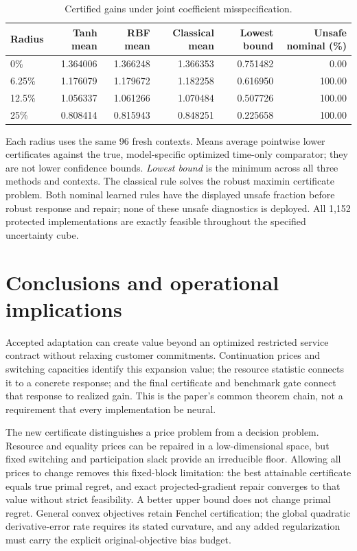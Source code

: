 \documentclass[11pt,letterpaper]{article}
\theoremstyle{definition}
\newcommand{\1}{\mathbf 1}
\begin{document}
\begin{table}[tbp]\centering\small
\caption{Certified gains under joint coefficient misspecification.}\label{tab:r23-robust}
\begin{tabular}{lrrrrr}\toprule
Radius & Tanh mean & RBF mean & Classical mean & Lowest bound & Unsafe nominal (\%)\\\midrule
0\% & 1.364006 & 1.366248 & 1.366353 & 0.751482 & 0.00\\
6.25\% & 1.176079 & 1.179672 & 1.182258 & 0.616950 & 100.00\\
12.5\% & 1.056337 & 1.061266 & 1.070484 & 0.507726 & 100.00\\
25\% & 0.808414 & 0.815943 & 0.848251 & 0.225658 & 100.00\\
\bottomrule\end{tabular}
\par\smallskip\begin{minipage}{.98\textwidth}\small Each radius uses the same 96 fresh contexts. Means average pointwise lower certificates against the true, model-specific optimized time-only comparator; they are not lower confidence bounds. \emph{Lowest bound} is the minimum across all three methods and contexts. The classical rule solves the robust maximin certificate problem. Both nominal learned rules have the displayed unsafe fraction before robust response and repair; none of these unsafe diagnostics is deployed. All 1,152 protected implementations are exactly feasible throughout the specified uncertainty cube.\end{minipage}
\end{table}

\section{Conclusions and operational implications}
Accepted adaptation can create value beyond an optimized restricted service contract without relaxing customer commitments. Continuation prices and switching capacities identify this expansion value; the resource statistic connects it to a concrete response; and the final certificate and benchmark gate connect that response to realized gain. This is the paper's common theorem chain, not a requirement that every implementation be neural.

The new certificate distinguishes a price problem from a decision problem. Resource and equality prices can be repaired in a low-dimensional space, but fixed switching and participation slack provide an irreducible floor. Allowing all prices to change removes this fixed-block limitation: the best attainable certificate equals true primal regret, and exact projected-gradient repair converges to that value without strict feasibility. A better upper bound does not change primal regret. General convex objectives retain Fenchel certification; the global quadratic derivative-error rate requires its stated curvature, and any added regularization must carry the explicit original-objective bias budget.
\end{document}
